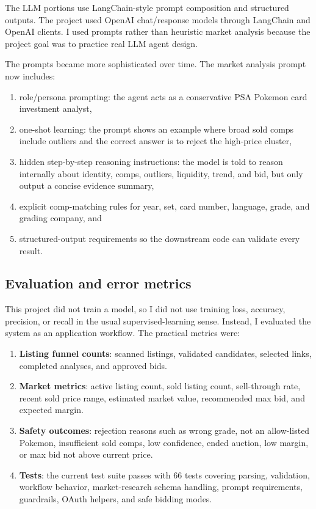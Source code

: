 \documentclass[10pt,twocolumn]{article}
\begin{document}
The LLM portions use LangChain-style prompt composition and structured outputs. The project used OpenAI chat/response models through LangChain and OpenAI clients. I used prompts rather than heuristic market analysis because the project goal was to practice real LLM agent design.

The prompts became more sophisticated over time. The market analysis prompt now includes:
\begin{enumerate}[leftmargin=*]
    \item role/persona prompting: the agent acts as a conservative PSA Pokemon card investment analyst,
    \item one-shot learning: the prompt shows an example where broad sold comps include outliers and the correct answer is to reject the high-price cluster,
    \item hidden step-by-step reasoning instructions: the model is told to reason internally about identity, comps, outliers, liquidity, trend, and bid, but only output a concise evidence summary,
    \item explicit comp-matching rules for year, set, card number, language, grade, and grading company, and
    \item structured-output requirements so the downstream code can validate every result.
\end{enumerate}

\subsection{Evaluation and error metrics}

This project did not train a model, so I did not use training loss, accuracy, precision, or recall in the usual supervised-learning sense. Instead, I evaluated the system as an application workflow. The practical metrics were:

\begin{enumerate}[leftmargin=*]
    \item \textbf{Listing funnel counts}: scanned listings, validated candidates, selected links, completed analyses, and approved bids.
    \item \textbf{Market metrics}: active listing count, sold listing count, sell-through rate, recent sold price range, estimated market value, recommended max bid, and expected margin.
    \item \textbf{Safety outcomes}: rejection reasons such as wrong grade, not an allow-listed Pokemon, insufficient sold comps, low confidence, ended auction, low margin, or max bid not above current price.
    \item \textbf{Tests}: the current test suite passes with 66 tests covering parsing, validation, workflow behavior, market-research schema handling, prompt requirements, guardrails, OAuth helpers, and safe bidding modes.
\end{enumerate}
\end{document}
